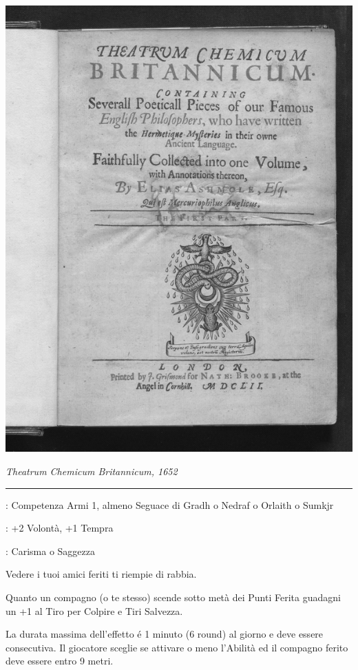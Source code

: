 \begin{multicols}{2}
\begin{center}
	\includegraphics[width=0.7\linewidth]{immagini/Theatrum_Chemicum_Britannicum.png}

	\emph{Theatrum Chemicum Britannicum, 1652}
\end{center}

\smallskip\noindent\rule{\linewidth}{2pt} \hypertarget{Rappresaglia}{}\medskip{}
\noindent
\begin{description}[noitemsep, topsep=0pt, parsep=0pt, partopsep=0pt, leftmargin=0cm, labelwidth=2.5cm]
    \item[\textbf{Requisito}]: Competenza Armi 1, almeno Seguace di Gradh o Nedraf o Orlaith o Sumkjr
    \item[\textbf{Tiri Salvezza}]: +2 Volontà, +1 Tempra
    \item[\textbf{Caratteristica}]: Carisma o Saggezza
\end{description}

Vedere i tuoi amici feriti ti riempie di rabbia.

Quanto un compagno (o te stesso) scende sotto metà dei Punti Ferita guadagni un +1 al Tiro per Colpire e Tiri Salvezza.

La durata massima dell'effetto é 1 minuto (6 round) al giorno e deve essere consecutiva. Il giocatore sceglie se attivare o meno l'Abilità ed il compagno ferito deve essere entro 9 metri.


\end{multicols}
